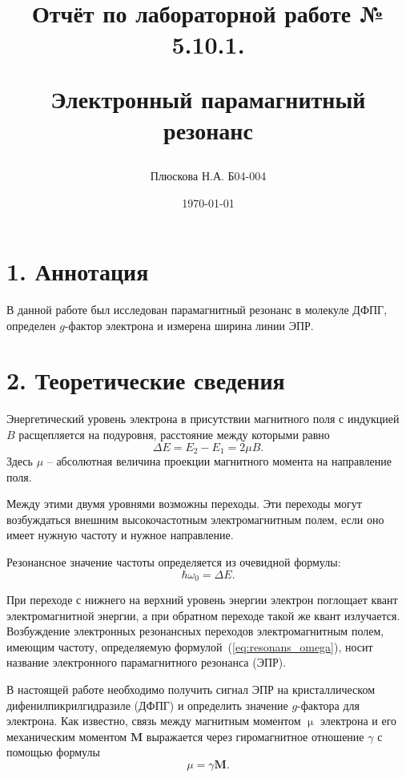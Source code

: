\documentclass[a4paper,12pt]{report}
\title{Отчёт по лабораторной работе № 5.10.1. 

Электронный парамагнитный резонанс}
\author{Плюскова Н.А. Б04-004 }
\date{\today}
\begin{document}
\maketitle
\section*{1. Аннотация}

В данной работе был исследован парамагнитный резонанс в молекуле ДФПГ, определен $g$-фактор электрона и измерена ширина линии ЭПР.

\section*{2. Теоретические сведения}
	Энергетический уровень электрона в присутствии магнитного поля с индукцией $B$ расщепляется на подуровня, расстояние между которыми равно 
	\begin{equation}
		\label{eq:dE}
		\Delta E = E_2 - E_1 = 2\mu B.
	\end{equation}
	Здесь $\mu$ -- абсолютная величина проекции магнитного момента на направление поля.
	
	Между этими двумя уровнями возможны переходы. Эти переходы могут возбуждаться внешним высокочастотным электромагнитным полем, если оно имеет нужную частоту и нужное направление.
	
	Резонансное значение частоты определяется из очевидной формулы:
	\begin{equation}
		\label{eq:resonans_omega}
		\hbar \omega_0 = \Delta E.
	\end{equation}

	При переходе с нижнего на верхний уровень энергии электрон поглощает квант электромагнитной энергии, а при обратном переходе такой же квант излучается. Возбуждение электронных резонансных переходов электромагнитным полем, имеющим частоту, определяемую формулой~(\ref{eq:resonans_omega}), носит название электронного парамагнитного резонанса (ЭПР).
	
	В настоящей работе необходимо получить сигнал ЭПР на кристаллическом дифенилпикрилгидразиле (ДФПГ) и определить значение $g$-фактора для электрона. Как известно, связь между магнитным моментом $\upmu$ электрона и его механическим моментом $\mathbf{M}$ выражается через гиромагнитное отношение $\gamma$ с помощью формулы
	\begin{equation}
		\label{eq:gyromagnit}
		\mu = \gamma \mathbf{M}.
	\end{equation}
\end{document}
